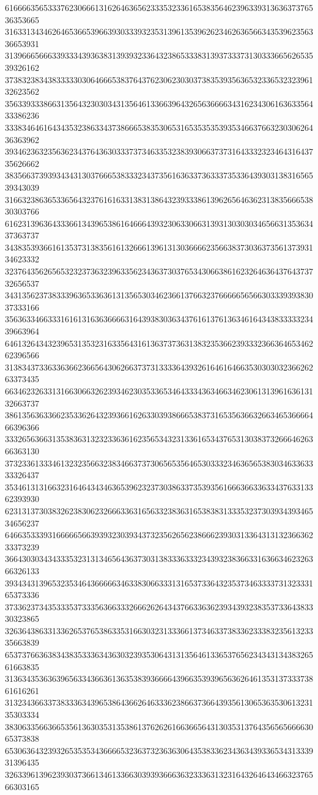 61666635653337623066613162646365623335323361653835646239633931363637376536353665
31633134346264653665396639303339323531396135396262346263656634353962356336653931
31396665666339333439363831393932336432386533383139373337313033366562653539326162
37383238343833333030646665383764376230623030373835393563653233653232396132623562
35633933386631356432303034313564613366396432656366663431623430616363356433386236
33383464616434353238633437386665383530653165353535393534663766323030626436363962
39346236323563623437643630333737346335323839306637373164333232346431643735626662
38356637393934343130376665383332343735616363373633373533643930313831656539343039
31663238636533656432376161633138313864323933386139626564636231383566653830303766
61623139636433366134396538616466643932306330663139313030303465663135363437363737
34383539366161353731383561613266613961313036666235663837303637356137393134623332
32376435626565323237363239633562343637303765343066386162326463643764373732656537
34313562373833396365336361313565303462366137663237666665656630333939383037333166
35636334663331616131636366663164393830363437616137613634616434383333323439663964
64613264343239653135323163356431613637373631383235366239333236636465346262396566
31383437336336366236656430626637373133336439326164616466353030303236626263373435
66346232633131663066326239346230353365346433343634663462306131396163613132663737
38613563633662353362643239366162633039386665383731653563663266346536666466396366
33326563663135383631323233636162356534323133616534376531303837326664626366363130
37323361333461323235663238346637373065653564653033323463656538303463363333326437
35346131316632316464343463653962323730386337353935616663663363343763313362393930
62313137303832623830623266633631656332383631653838313335323730393439346534656237
64663533393166666566393932303934373235626562386662393031336431313236636233373239
36643030343433353231313465643637303138333633323439323836633163663462326366326133
39343431396532353464366666346338306633313165373364323537346333373132333165373336
37336237343533353733356366333266626264343766336362393439323835373364383330323865
32636438633133626537653863353166303231333661373463373833623338323561323335663839
65373766363834383533363436303239353064313135646133653765623434313438326561663835
31363435363639656334366361363538393666643966353939656362646135313733373861616261
31323436633738333634396538643662646333623866373664393561306536353061323135303334
38306335663665356136303531353861376262616636656431303531376435656566663065373838
65306364323932653535343666653236373236363064353833623436343933653431333931396435
32633961396239303736613461336630393936663632333631323164326464346632376566303165
